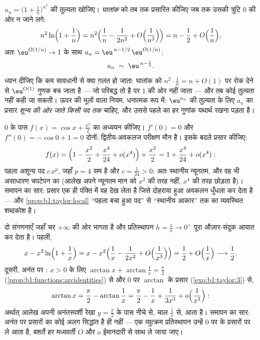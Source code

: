 \begin{example}[घातांकों को $o(1)$ तक प्रसारित करना पड़ता है]\label{ex:b1:taylor:expdiscipline}
$u_n = \bigl(1 + \frac1n\bigr)^{n^2}$ की तुल्यता खोजिए। \emph{घातांक} को तब
तक प्रसारित कीजिए जब तक उसकी त्रुटि $0$ की ओर न जाने लगे:
\[
n^2 \ln\Bigl(1 + \frac1n\Bigr)
= n^2\Bigl(\frac1n - \frac{1}{2n^2} +
O\Bigl(\frac{1}{n^3}\Bigr)\Bigr)
= n - \frac12 + O\Bigl(\frac1n\Bigr),
\]
अतः $\eu^{O(1/n)} \to 1$ के साथ $u_n = \eu^{\,n - 1/2}\,\eu^{O(1/n)}$:
\[
u_n \;\sim\; \eu^{\,n - \frac12} .
\]
ध्यान दीजिए कि कम सावधानी से क्या ग़लत हो जाता: घातांक को $n^2\cdot\frac1n =
n + O(1)$ पर रोक देने से $\eu^{O(1)}$ गुणक बच जाता है --- जो परिबद्ध तो है
पर $1$ की ओर नहीं जाता --- और तब कोई तुल्यता नहीं कही जा सकती। ऊपर की भूलों
वाला नियम, धनात्मक रूप में: $\eu^{a_n}$ की तुल्यता के लिए $a_n$ का प्रसार
\emph{शून्य की ओर जाते किसी पद तक} चाहिए, और उससे पहले का हर गुणांक यथार्थ
रखना पड़ता है।
\end{example}

\begin{example}\label{ex:b1:taylor:flatmin}
$0$ के पास $f(x) = \cos x + \frac{x^2}{2}$ का अध्ययन कीजिए। $f'(0) = 0$ और
$f''(0) = -\cos 0 + 1 = 0$ दोनों: द्वितीय-अवकलज परीक्षण मौन है। इसके बदले
प्रसार कीजिए:
\[
f(x) = \Bigl(1 - \frac{x^2}{2} + \frac{x^4}{24} +
o(x^4)\Bigr) + \frac{x^2}{2}
= 1 + \frac{x^4}{24} + o(x^4) :
\]
पहला अशून्य पद $c\,x^p$, जहाँ $p = 4$ सम है और $c = \frac{1}{24} > 0$: अतः
स्थानीय न्यूनतम, और वह भी असाधारण चपटेपन का (आलेख अपने न्यूनतम मान को $x^2$
की तरह नहीं, $x^4$ की तरह छोड़ता है)। समापन का सार: प्रसार एक ही पंक्ति में
वह देख लेता है जिसे दोहराया हुआ अवकलन धुँधला कर देता है --- और
\cref{prop:b1:taylor:local} ``पहला बचा हुआ पद'' से ``स्थानीय आकार'' तक का
व्यवस्थित शब्दकोश है।
\end{example}

\begin{example}[अनंत पर प्रसार]\label{ex:b1:taylor:atinfinity}
दो संगणनाएँ जहाँ चर $+\infty$ की ओर भागता है और प्रतिस्थापन $h = \frac1x \to
0^+$ पूरा औज़ार-संदूक आयात कर देता है। पहली,
\[
x - x^2\ln\Bigl(1 + \frac1x\Bigr)
= x - x^2\Bigl(\frac1x - \frac{1}{2x^2} +
O\Bigl(\frac{1}{x^3}\Bigr)\Bigr)
= \frac12 + O\Bigl(\frac1x\Bigr) \longrightarrow \frac12 .
\]
दूसरी, अनंत पर : $x > 0$ के लिए $\arctan x +
\arctan\frac1x = \frac\pi2$ (\cref{prop:b1:functions:arcidentities}) से और
$0$ पर $\arctan$ के प्रसार (\cref{exo:b1:taylor:3}) से,
\[
\arctan x = \frac\pi2 - \arctan\frac1x
= \frac\pi2 - \frac1x + \frac{1}{3x^3} +
o\Bigl(\frac{1}{x^3}\Bigr) :
\]
अर्थात् आलेख अपनी अनंतस्पर्शी रेखा $y = \frac\pi2$ के पास नीचे से, चाल
$\frac1x$ से, आता है। समापन का सार: अनंत पर प्रसारों का कोई अलग सिद्धांत है
ही नहीं --- एक व्युत्क्रम प्रतिस्थापन उन्हें $0$ पर के प्रसारों पर ले आता
है, बशर्ते हर मध्यवर्ती $O$ और $o$ ईमानदारी से साथ ले जाया जाए।
\end{example}

